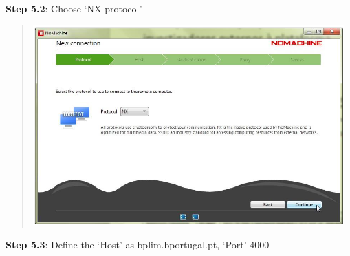\documentclass[]{book}
\begin{document}
\textbf{Step 5.2}: Choose `NX protocol'

\begin{quote}
\includegraphics[width=4.72441in,height=3.0302in]{./media/image27.png}
\end{quote}

\textbf{Step 5.3}: Define the `Host' as bplim.bportugal.pt, `Port' 4000
\end{document}
